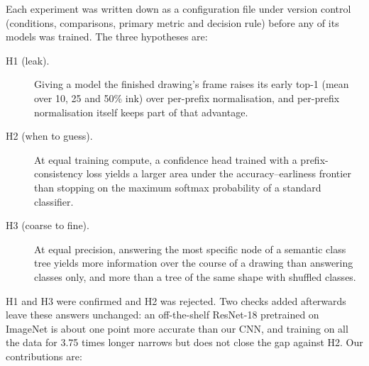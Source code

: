 Each experiment was written down as a configuration file under version control (conditions,
comparisons, primary metric and decision rule) before any of its models was trained. The three
hypotheses are:
\begin{description}
\item[H1 (leak).] Giving a model the finished drawing's frame raises its early top-1 (mean over
10, 25 and 50\% ink) over per-prefix normalisation, and per-prefix normalisation itself keeps
part of that advantage.
\item[H2 (when to guess).] At equal training compute, a confidence head trained with a
prefix-consistency loss yields a larger area under the accuracy--earliness frontier than
stopping on the maximum softmax probability of a standard classifier.
\item[H3 (coarse to fine).] At equal precision, answering the most specific node of a semantic
class tree yields more information over the course of a drawing than answering classes only, and
more than a tree of the same shape with shuffled classes.
\end{description}
H1 and H3 were confirmed and H2 was rejected. Two checks added afterwards leave these answers
unchanged: an off-the-shelf ResNet-18 pretrained on ImageNet is about one point more accurate than
our CNN, and training on all the data for 3.75 times longer narrows but does not close the gap
against H2. Our contributions are:
